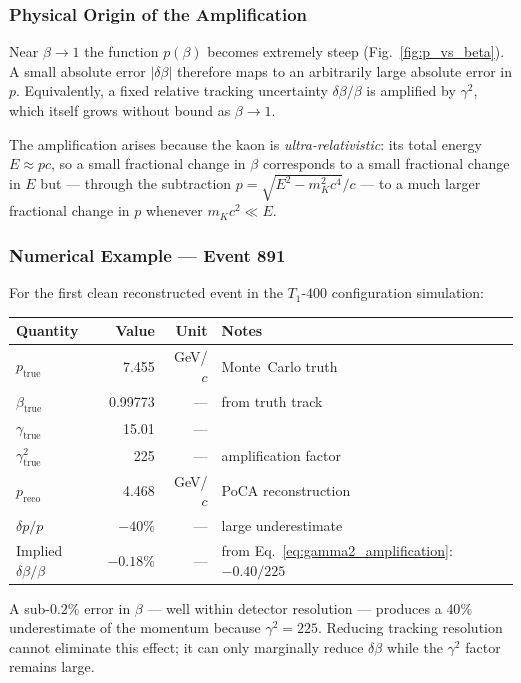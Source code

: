 \subsubsection{Physical Origin of the Amplification}

Near $\beta \to 1$ the function $p(\beta)$ becomes extremely steep
(Fig.~\ref{fig:p_vs_beta}).  A small absolute error $|\delta\beta|$ therefore maps to
an arbitrarily large absolute error in $p$.  Equivalently, a fixed relative tracking
uncertainty $\delta\beta/\beta$ is amplified by $\gamma^2$, which itself grows
without bound as $\beta \to 1$.

The amplification arises because the kaon is \emph{ultra-relativistic}: its total
energy $E \approx pc$, so a small fractional change in $\beta$ corresponds to a
small fractional change in $E$ but — through the subtraction
$p = \sqrt{E^2 - m_K^2 c^4}/c$ — to a much larger fractional change in $p$ whenever
$m_K c^2 \ll E$.

\subsubsection{Numerical Example — Event 891}

For the first clean reconstructed event in the
$T_{1}\text{-}400$ configuration simulation:

\begin{center}
\begin{tabular}{lrrl}
  \toprule
  Quantity & Value & Unit & Notes \\
  \midrule
  $p_{\text{true}}$  & 7.455  & GeV/$c$ & Monte~Carlo truth \\
  $\beta_{\text{true}}$ & 0.99773 & --- & from truth track \\
  $\gamma_{\text{true}}$ & 15.01  & --- & \\
  $\gamma^2_{\text{true}}$ & 225 & --- & amplification factor \\[4pt]
  $p_{\text{reco}}$  & 4.468  & GeV/$c$ & PoCA reconstruction \\
  $\delta p/p$       & $-40\%$ & --- & large underestimate \\[4pt]
  Implied $\delta\beta/\beta$ & $-0.18\%$ & --- &
        from Eq.~\eqref{eq:gamma2_amplification}: $-0.40/225$ \\
  \bottomrule
\end{tabular}
\end{center}

A sub-$0.2\%$ error in $\beta$ — well within detector resolution — produces a
$40\%$ underestimate of the momentum because $\gamma^2 = 225$.
Reducing tracking resolution cannot eliminate this effect; it can only marginally
reduce $\delta\beta$ while the $\gamma^2$ factor remains large.


